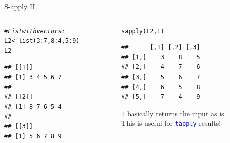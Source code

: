 \documentclass[xcolor=table,       handout,    xcolor=dvipsnames]{beamer}\usepackage[]{graphicx}\usepackage[]{color}
\makeatletter
\newcommand{\hlnum}[1]{\textcolor[rgb]{0,0,0}{#1}}
\newcommand{\hlcom}[1]{\textcolor[rgb]{0,0.392,0}{\textit{#1}}}
\newcommand{\hlopt}[1]{\textcolor[rgb]{0,0,0}{#1}}
\newcommand{\hlstd}[1]{\textcolor[rgb]{0,0,0}{#1}}
\newcommand{\hlkwb}[1]{\textcolor[rgb]{0,0,0}{#1}}
\newcommand{\hlkwd}[1]{\textcolor[rgb]{0,0,1}{#1}}
\newenvironment{kframe}{%
 \def\at@end@of@kframe{}%
 \ifinner\ifhmode%
  \def\at@end@of@kframe{\end{minipage}}%
  \begin{minipage}{\columnwidth}%
 \fi\fi%
 \def\FrameCommand##1{\hskip\@totalleftmargin \hskip-\fboxsep
 \colorbox{shadecolor}{##1}\hskip-\fboxsep
     \hskip-\linewidth \hskip-\@totalleftmargin \hskip\columnwidth}%
 \MakeFramed {\advance\hsize-\width
   \@totalleftmargin\z@ \linewidth\hsize
   \@setminipage}}%
 {\par\unskip\endMakeFramed%
 \at@end@of@kframe}
\newenvironment{knitrout}{}{} %
\newcommand{\rcode}[1]{\texttt{\textcolor{Blue}{#1}}} %
\makeatother
\begin{document}
\begin{frame}[fragile]{S-apply II}
\begin{columns}
\begin{column}{.45\textwidth}
\begin{knitrout}
\color{fgcolor}\begin{kframe}
\begin{alltt}
\hlcom{# List with vectors:}
\hlstd{L2} \hlkwb{<-} \hlkwd{list}\hlstd{(}\hlnum{3}\hlopt{:}\hlnum{7}\hlstd{,} \hlnum{8}\hlopt{:}\hlnum{4}\hlstd{,} \hlnum{5}\hlopt{:}\hlnum{9}\hlstd{)}
\hlstd{L2}
\end{alltt}
\begin{verbatim}
## [[1]]
## [1] 3 4 5 6 7
## 
## [[2]]
## [1] 8 7 6 5 4
## 
## [[3]]
## [1] 5 6 7 8 9
\end{verbatim}
\end{kframe}
\end{knitrout}
\end{column}
\pause
\begin{column}{.45\textwidth}
\begin{knitrout}
\color{fgcolor}\begin{kframe}
\begin{alltt}
\hlkwd{sapply}\hlstd{(L2, I)}
\end{alltt}
\begin{verbatim}
##      [,1] [,2] [,3]
## [1,]    3    8    5
## [2,]    4    7    6
## [3,]    5    6    7
## [4,]    6    5    8
## [5,]    7    4    9
\end{verbatim}
\end{kframe}
\end{knitrout}
\rcode{I} basically returns the input as is.\\
This is useful for \rcode{tapply} results!
\end{column}
\end{columns}
\end{frame}

\end{document}
